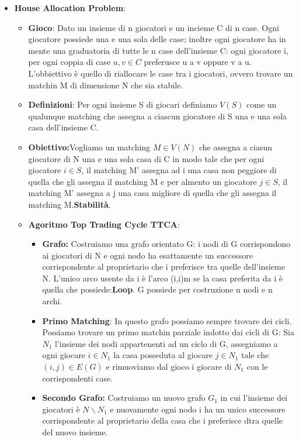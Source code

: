 \documentclass{article}
\theoremstyle{definition}
\theoremstyle{remark}
\begin{document}
\begin{itemize}
\begin{itemize}
\begin{itemize}
        \end{itemize}
        \item \textbf{House Allocation Problem}: \begin{itemize}
            \item \textbf{Gioco}: Dato un insieme di n giocatori e un incieme C di n case. Ogni giocatore possiede una e una sola delle case; inoltre ogni giocatore ha in mente una graduatoria di tutte le n case
             dell'insieme C: ogni giocatore i, per ogni coppia di case \(u,v\in C\) preferusce u a v oppure v a u. L'obbiettivo è quello di riallocare le case tra i giocatori, ovvero trovare un matchin M di dimensione N che sia stabile.
             \item \textbf{Definizioni}: Per ogni insieme S di giocari definiamo \(V(S)\) come un qualunque matching che assegna a ciascun giocatore di S una e una sola casa dell'insieme C.
             \item \textbf{Obiettivo:}Vogliamo un matching \(M\in V(N)\) che assegna a ciasun giocatore di N una e una sola casa di C in modo tale che per ogni giocatore \(i\in S\), il matching M' assegna ad i una casa non peggiore di quella che
             gli assegna il matching M e per almento un giocatore \(j\in S\), il matching M' assegna a j una casa migliore di quella che gli assegna il matching M.\textbf{Stabilità}.
             \item \textbf{Agoritmo Top Trading Cycle TTCA}: \begin{itemize}
                 \item \textbf{Grafo:} Costruiamo una grafo orientato G: i nodi di G corrispondono ai giocatori di N e ogni nodo ha esattamente un successore corrispondente al proprietario che i preferisce tra quelle dell'insieme N.
                 L'unico arco usente da i è l'arco (i,i)m se la casa preferita da i è quella che possiede:\textbf{Loop}.\newline
                 G possiede per costruzione n nodi e n archi.
                 \item \textbf{Primo Matching}: In questo grafo possiamo sempre trovare dei cicli. Possiamo trovare un primo matchin parziale indotto dai cicli di G:\newline
                 Sia \(N_1\) l'insieme dei nodi appartenenti ad un ciclo di G, assegniamo a ogni giocare \(i\in N_1\) la casa posseduta al giocare \(j\in N_1\) tale che \((i,j)\in E(G)\) e rimuoviamo dal gioco i giocare di \(N_1\) con le corrispondenti case.
                 \item\textbf{Secondo Grafo:} Costruiamo un nuovo grafo \(G_1\) in cui l'insieme dei giocatori è \(N\backslash N_1\) e nuovamente ogni nodo i ha un unico successore corrispondente al proprietario della casa che i preferisce dtra quelle del nuovo insieme.\newline

\end{itemize}
\end{itemize}
\end{itemize}
\end{itemize}
\end{document}
